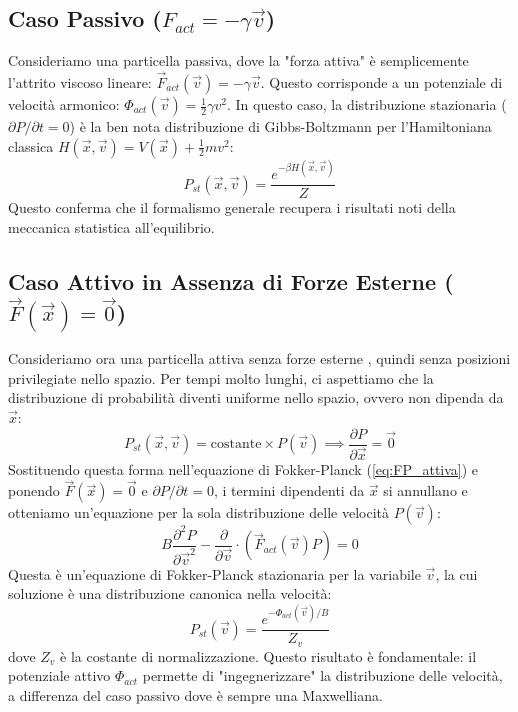 \subsection{Caso Passivo ($F_{act} = -\gamma \vec{v}$)}
Consideriamo una particella passiva, dove la "forza attiva" è semplicemente l'attrito viscoso lineare: $\vec{F}_{act}(\vec{v}) = -\gamma \vec{v}$. Questo corrisponde a un potenziale di velocità armonico: $\Phi_{act}(\vec{v}) = \frac{1}{2}\gamma v^2$. In questo caso, la distribuzione stazionaria ($\partial P / \partial t = 0$) è la ben nota distribuzione di Gibbs-Boltzmann per l'Hamiltoniana classica $H(\vec{x}, \vec{v}) = V(\vec{x}) + \frac{1}{2}mv^2$:
\begin{equation}
    P_{st}(\vec{x}, \vec{v}) = \frac{e^{-\beta H(\vec{x}, \vec{v})}}{Z}
\end{equation}
Questo conferma che il formalismo generale recupera i risultati noti della meccanica statistica all'equilibrio.

\subsection{Caso Attivo in Assenza di Forze Esterne ($\vec{F}(\vec{x}) = \vec{0}$)}
Consideriamo ora una particella attiva senza forze esterne , quindi senza posizioni privilegiate nello spazio. Per tempi molto lunghi, ci aspettiamo che la distribuzione di probabilità diventi uniforme nello spazio, ovvero non dipenda da $\vec{x}$:
\begin{equation}
    P_{st}(\vec{x}, \vec{v}) = \text{costante} \times P(\vec{v}) \implies \frac{\partial P}{\partial \vec{x}} = \vec{0}
    \label{eq:ansatz_homog}
\end{equation}
Sostituendo questa forma nell'equazione di Fokker-Planck (\ref{eq:FP_attiva}) e ponendo $\vec{F}(\vec{x})=\vec{0}$ e $\partial P / \partial t = 0$, i termini dipendenti da $\vec{x}$ si annullano e otteniamo un'equazione per la sola distribuzione delle velocità $P(\vec{v})$:
\begin{equation}
    B \frac{\partial^2 P}{\partial \vec{v}^2} - \frac{\partial}{\partial \vec{v}} \cdot \left( \vec{F}_{act}(\vec{v}) P \right) = 0
\end{equation}
Questa è un'equazione di Fokker-Planck stazionaria per la variabile $\vec{v}$, la cui soluzione è una distribuzione canonica nella velocità:
\begin{equation}
    P_{st}(\vec{v}) = \frac{e^{-\Phi_{act}(\vec{v})/B}}{Z_v}
    \label{eq:distr_vel_attiva}
\end{equation}
dove $Z_v$ è la costante di normalizzazione. Questo risultato è fondamentale: il potenziale attivo $\Phi_{act}$ permette di "ingegnerizzare" la distribuzione delle velocità, a differenza del caso passivo dove è sempre una Maxwelliana.

